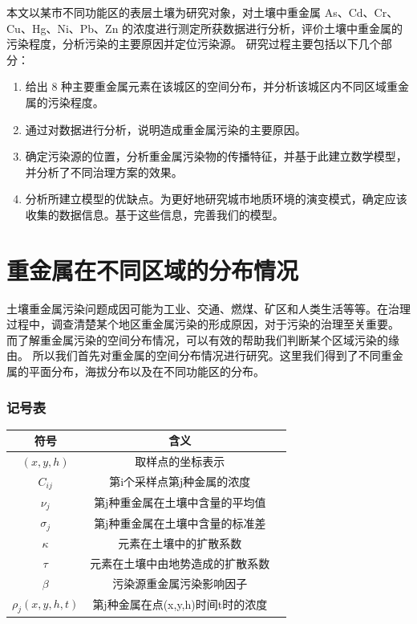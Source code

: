 \documentclass[a4paper]{article}
\begin{document}
\indent 本文以某市不同功能区的表层土壤为研究对象，对土壤中重金属 As、Cd、Cr、
Cu、Hg、Ni、Pb、Zn 的浓度进行测定所获数据进行分析，评价土壤中重金属的污染程度，分析污染的主要原因并定位污染源。
研究过程主要包括以下几个部分：\\
\begin{enumerate}
\item 给出 8 种主要重金属元素在该城区的空间分布，并分析该城区内不同区域重金属的污染程度。
\item 通过对数据进行分析，说明造成重金属污染的主要原因。  
\item 确定污染源的位置，分析重金属污染物的传播特征，并基于此建立数学模型，并分析了不同治理方案的效果。  
\item 分析所建立模型的优缺点。为更好地研究城市地质环境的演变模式，确定应该收集的数据信息。基于这些信息，完善我们的模型。  
\end{enumerate}
\part{重金属在不同区域的分布情况}
\indent 土壤重金属污染问题成因可能为工业、交通、燃煤、矿区和人类生活等等。在治理过程中，调查清楚某个地区重金属污染的形成原因，对于污染的治理至关重要。
而了解重金属污染的空间分布情况，可以有效的帮助我们判断某个区域污染的缘由。
所以我们首先对重金属的空间分布情况进行研究。这里我们得到了不同重金属的平面分布，海拔分布以及在不同功能区的分布。   \\
\section*{记号表}
\begin{table}[H]
	\centering
	\label{tab:problem1_symbols}
	\begin{tabular}{c|cc}
		\hline
		符号 & 含义  \\
		\hline
		$(x,y,h)$ &取样点的坐标表示   \\
		$C_{ij}$ & 第i个采样点第j种金属的浓度  \\
		$\nu_j$   &  第j种重金属在土壤中含量的平均值  \\
		$\sigma_j$  &   第j种重金属在土壤中含量的标准差 \\
         $\kappa$ & 元素在土壤中的扩散系数      \\
		$\tau$   & 元素在土壤中由地势造成的扩散系数      \\
		$\beta$   &  污染源重金属污染影响因子            \\
		$\rho_{j}(x,y,h,t)$   & 第j种金属在点(x,y,h)时间t时的浓度 \\	
		\hline
	\end{tabular} \\
\end{table}
\end{document}
